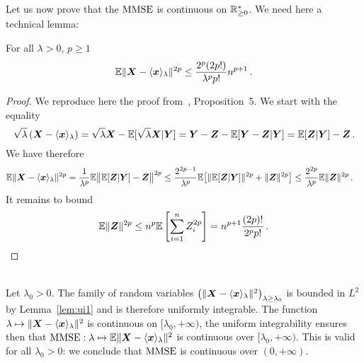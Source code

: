 \documentclass[12pt,nocut]{article}
\begin{document}
	Let us now prove that the ${{\rm MMSE}}$ is continuous on $\mathbb{R}_{\geq 0}^*$. We need here a technical lemma:
	\begin{lemma}\label{lem:ui1}
		For all $\lambda > 0$, $p \geq 1$
		$$
		\mathbb{E} \| {\boldsymbol X} - \langle {\boldsymbol x} \rangle_{\lambda} \|^{2p} \leq \frac{2^p (2p !)}{\lambda ^{p} p!} n^{p+1} \,.
		$$
	\end{lemma}
	\begin{proof}
		We reproduce here the proof from~\cite{guo2011estimation}, Proposition~5. We start with the equality
		$$
		\sqrt{\lambda} \left({\boldsymbol X} - \langle {\boldsymbol x} \rangle_{\lambda}\right)
		=
		\sqrt{\lambda} {\boldsymbol X} - \mathbb{E} [ \sqrt{\lambda} {\boldsymbol X} | {\boldsymbol Y} ]
		=
		{\boldsymbol Y} - {\boldsymbol Z} - \mathbb{E} [ {\boldsymbol Y} - {\boldsymbol Z} | {\boldsymbol Y} ]
		=
		\mathbb{E} [ {\boldsymbol Z} | {\boldsymbol Y} ] -{\boldsymbol Z} \,.
		$$
		We have therefore
		\begin{align*}
			\mathbb{E} \| {\boldsymbol X} - \langle {\boldsymbol x} \rangle_{\lambda} \|^{2p} 
			&= \frac{1}{\lambda ^{p}} 
			\mathbb{E} \big\| \mathbb{E} [ {\boldsymbol Z} | {\boldsymbol Y} ] -{\boldsymbol Z}\big\|^{2p}
			\leq 
			\frac{2^{2p-1}}{\lambda ^{p}} 
			\mathbb{E} \big[  \|\mathbb{E} [ {\boldsymbol Z} | {\boldsymbol Y} ]\|^{2p} +\|{\boldsymbol Z}\|^{2p} \big]
			\leq
			\frac{2^{2p}}{\lambda ^{p}} 
			\mathbb{E} \|{\boldsymbol Z}\|^{2p} \,.
		\end{align*}
		It remains to bound
		$$
		\mathbb{E} \|{\boldsymbol Z}\|^{2p}
		\leq n^p \mathbb{E} \left[\sum_{i=1}^n Z_i^{2p} \right]
		= n^{p+1} \frac{(2p)!}{2^p p!} \,.
		$$
	\end{proof}
	\\

	Let $\lambda_0 > 0$. The family of random variables $\big(\| {\boldsymbol X} - \langle {\boldsymbol x}\rangle_{\lambda}\|^2\big)_{\lambda \geq \lambda_0}$ is bounded in $L^2$ by Lemma~\ref{lem:ui1} and is therefore uniformly integrable. The function $\lambda \mapsto \| {\boldsymbol X} - \langle {\boldsymbol x}\rangle_{\lambda}\|^2$ is continuous on $[\lambda_0,+\infty)$, the uniform integrability ensures then that ${{\rm MMSE}}: \lambda \mapsto  \mathbb{E}\| {\boldsymbol X} - \langle {\boldsymbol x}\rangle_{\lambda}\|^2$ is continuous over $[\lambda_0,+\infty)$. This is valid for all $\lambda_0 >0$: we conclude that ${{\rm MMSE}}$ is continuous over $(0,+\infty)$.

%
%
\end{document}
